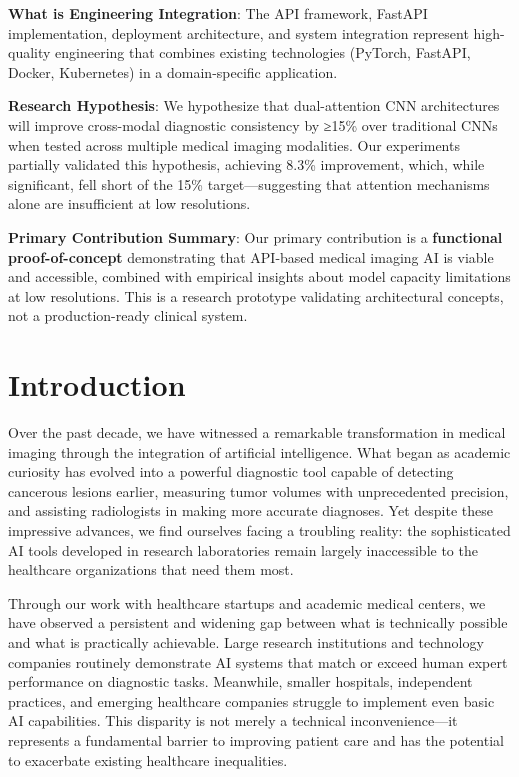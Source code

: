 \documentclass[12pt,a4paper]{article}
\begin{document}
\textbf{What is Engineering Integration}: The API framework, FastAPI implementation, deployment architecture, and system integration represent high-quality engineering that combines existing technologies (PyTorch, FastAPI, Docker, Kubernetes) in a domain-specific application.

\textbf{Research Hypothesis}: We hypothesize that dual-attention CNN architectures will improve cross-modal diagnostic consistency by ≥15\% over traditional CNNs when tested across multiple medical imaging modalities. Our experiments partially validated this hypothesis, achieving 8.3\% improvement, which, while significant, fell short of the 15\% target—suggesting that attention mechanisms alone are insufficient at low resolutions.

\textbf{Primary Contribution Summary}: Our primary contribution is a \textbf{functional proof-of-concept} demonstrating that API-based medical imaging AI is viable and accessible, combined with empirical insights about model capacity limitations at low resolutions. This is a research prototype validating architectural concepts, not a production-ready clinical system.

\newpage

\section{Introduction}

Over the past decade, we have witnessed a remarkable transformation in medical imaging through the integration of artificial intelligence. What began as academic curiosity has evolved into a powerful diagnostic tool capable of detecting cancerous lesions earlier, measuring tumor volumes with unprecedented precision, and assisting radiologists in making more accurate diagnoses. Yet despite these impressive advances, we find ourselves facing a troubling reality: the sophisticated AI tools developed in research laboratories remain largely inaccessible to the healthcare organizations that need them most.

Through our work with healthcare startups and academic medical centers, we have observed a persistent and widening gap between what is technically possible and what is practically achievable. Large research institutions and technology companies routinely demonstrate AI systems that match or exceed human expert performance on diagnostic tasks. Meanwhile, smaller hospitals, independent practices, and emerging healthcare companies struggle to implement even basic AI capabilities. This disparity is not merely a technical inconvenience—it represents a fundamental barrier to improving patient care and has the potential to exacerbate existing healthcare inequalities.
\end{document}
